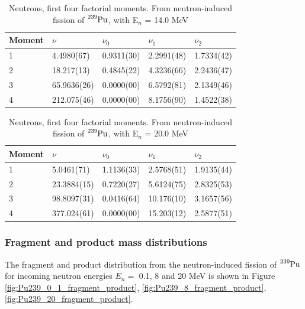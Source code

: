 \documentclass[]{article}
\begin{document}
\begin{table} [H]
	\centering
	\caption{Neutrons, first four factorial moments. From neutron-induced fission of $\ce{^{239}Pu}$, with E$_n$ = 14.0 MeV }
	\begin{tabularx}{\textwidth}{XXXXX} \hline
		\label{tab:Pu239_n_moments_14}
		Moment & $\nu$ & $\nu_0$ & $\nu_1$ & $\nu_2$ \\ \hline
		1 & 4.4980(67) & 0.9311(30) & 2.2991(48) & 1.7334(42)\\
		2 & 18.217(13) & 0.4845(22) & 4.3236(66) & 2.2436(47)\\
		3 & 65.9636(26) & 0.0000(00) & 6.5792(81) & 2.1349(46)\\
		4 & 212.075(46) & 0.0000(00) & 8.1756(90) & 1.4522(38)\\ 
	\end{tabularx}
\end{table}

\begin{table} [H]
	\centering
	\caption{Neutrons, first four factorial moments. From neutron-induced fission of $\ce{^{239}Pu}$, with E$_n$ = 20.0 MeV }
	\begin{tabularx}{\textwidth}{XXXXX} \hline
		\label{tab:Pu239_n_moments_20}
		Moment & $\nu$ & $\nu_0$ & $\nu_1$ & $\nu_2$ \\ \hline
		1 & 5.0461(71) & 1.1136(33) & 2.5768(51) & 1.9135(44)\\
		2 & 23.3884(15) & 0.7220(27) & 5.6124(75) & 2.8325(53)\\
		3 & 98.8097(31) & 0.0416(64) & 10.176(10) & 3.1657(56)\\
		4 & 377.024(61) & 0.0000(00) & 15.203(12) & 2.5877(51)\\ 
	\end{tabularx}
\end{table}

\subsubsection{Fragment and product mass distributions}

The fragment and product distribution from the neutron-induced fission of $\ce{^{239}Pu}$ for incoming neutron energies $E_n=$ 0.1, 8 and 20 MeV is shown in Figure \ref{fig:Pu239_0_1_fragment_product}, \ref{fig:Pu239_8_fragment_product}, \ref{fig:Pu239_20_fragment_product}.
\end{document}
